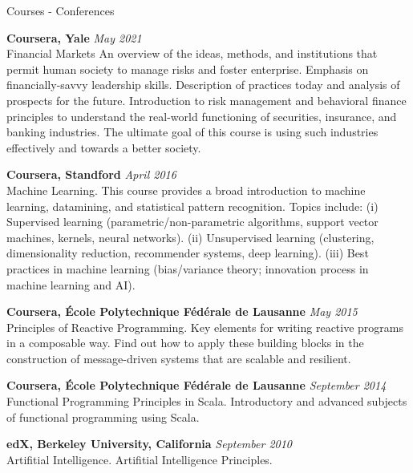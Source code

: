 \documentclass[spanish]{resume}
\begin{document}
\begin{rSection}{Courses - Conferences}

{\bf Coursera, Yale} \hfill {\em May 2021} \\
Financial Markets
An overview of the ideas, methods, and institutions that permit human society to manage risks and foster enterprise.  Emphasis on financially-savvy leadership skills. Description of practices today and analysis of prospects for the future. Introduction to risk management and behavioral finance principles to understand the real-world functioning of securities, insurance, and banking industries.  The ultimate goal of this course is using such industries effectively and towards a better society.


{\bf Coursera, Standford} \hfill {\em April 2016} \\
Machine Learning.
This course provides a broad introduction to machine learning, datamining, and statistical pattern recognition. Topics include: (i) Supervised learning (parametric/non-parametric algorithms, support vector machines, kernels, neural networks). (ii) Unsupervised learning (clustering, dimensionality reduction, recommender systems, deep learning). (iii) Best practices in machine learning (bias/variance theory; innovation process in machine learning and AI).

{\bf Coursera, \'Ecole Polytechnique F\'ed\'erale de Lausanne} \hfill {\em May 2015} \\
Principles of Reactive Programming.
Key elements for writing reactive programs in a composable way. Find out how to apply these building blocks in the construction of message-driven systems that are scalable and resilient.

{\bf Coursera, \'Ecole Polytechnique F\'ed\'erale de Lausanne} \hfill {\em September 2014} \\
Functional Programming Principles in Scala.
Introductory and advanced subjects of functional programming using Scala.

{\bf edX, Berkeley University, California} \hfill {\em September 2010} \\
Artifitial Intelligence.
Artifitial Intelligence Principles.

\end{rSection}
\end{document}
